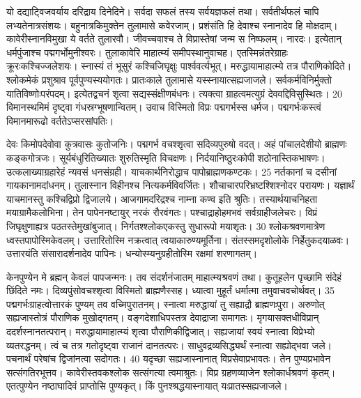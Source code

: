 यो दद्याट्विजवर्याय दरिद्राय दिनेदिने।
 सर्वदा सफलं तस्य सर्वयज्ञफलं तथा।
 सर्वतीर्थफलं चापि लभ्यतेनात्रसंशयः।
 बहुनात्रकिमुक्तेन तुलामासे कवेरजाम्।
 प्रशंसंति हि देवाश्च स्नानादेव हि मोक्षदाम्।
 कावेरीस्नानविमुखा ये वर्तते तुलारवौ।
 जीवच्चवाश्च ते विप्रास्तेषां जन्म स निष्फलम्।
 नारदः।
 इत्येतान् धर्मपुंजाश्च पद्मगर्भोमुनीश्वरः।
 तुलाकावेरि माहात्म्यं समीपस्थानुवाचह।
 एतस्मिन्नंतरेग्राहः क्रूरःकश्चिज्जलेशयः।
 स्नास्यं तं भूसुरं कश्चिजिघृक्षुः पार्श्ववर्त्यभूत्।
 मरुद्धायामाहात्म्ये तत्र पौराणिकोदिते।
 श्लोकमेकं प्रशुश्राव पूर्वपुण्यस्ययोगतः।
 प्रातःकाले तुलामासे यस्स्नायात्सह्यजाजले।
 सर्वकर्मविनिर्मुक्तो यातिविष्णोःपरंपदम्।
 इत्येतद्वचनं शृत्वा सद्यस्संक्षीणबंधनः।
 त्यक्त्वा ग्राहत्वमत्युग्रं देववद्दिविसुस्थितः।
 20 विमानस्थमिमं दृष्ट्वा गंधस्रग्भूषणान्वितम्।
 उवाच विस्मितो विप्रः पद्मगर्भस्स धर्मज।
 पद्मगर्भःकस्त्वं विमानमारूढो वर्ततेऽप्सरसांपतिः।
 
देवः किमोपदेवोवा कुत्रवासः कुतोजनिः।
 पद्मगर्भ वचश्शृत्वा सदिव्यपुरुषो वदत्।
 अहं पांचालदेशीयो ब्राह्मणः कङ्कगोत्रजः।
 सूर्यबंधुरितिख्यातः शुरुतिस्मृति विचक्षणः।
 निर्दयानिष्ठुरःकोपी शठोनास्तिकभाषणः।
 उत्कलाख्याग्रहारेहं न्यवसं धनसंग्रही।
 याचकार्थनिरोद्धाच पापोब्राह्मणकण्टकः।
 25 नर्तकानां च दसीनां गायकानामदांधनम्।
 तुलास्नान विहीनश्च नित्यकर्मविवर्जितः।
 शौचाचारपरिभ्रष्टश्शिश्नोदर परायणः।
 यज्ञार्थं याचमानस्तु कश्चिद्विप्रो द्विजालये।
 आजगामदरिद्रश्च नाम्ना कण्व इति श्रुतिः।
 तस्यार्थयाचनिहता मयाग्रामैकलोभिना।
 तेन पापेननष्टायुर् नरकं रौरवंगतः।
 पश्चाद्राहोहमभवं सर्वग्राहीजलेचरः।
 विप्रं जिघृक्षुणाह्यत्र पठतस्तेमुखांबुजात्।
 निर्गतश्श्लोकएकस्तु सुधारूपो मयाशृतः।
 30 श्लोकश्रवणमात्रेण ध्वस्तपापोस्मिकेवलम्।
 उत्तारितोस्मि नक्रत्वात् त्वयाकारुण्यमूर्तिना।
 संतस्समदृशोलोके निर्हेतुकदयाळवः।
 उत्तारयंति संसारादर्शनादेव पापिनः।
 धन्योस्म्यनुग्रहीतोस्मि रक्षमां शरणागतम्।
 
केनपुण्येन मे ब्रह्मन् केवलं पापजन्मनः।
 तव संदर्शनंजातम् माहात्म्यश्रवणं तथा।
 कुतूहलेन पृच्छामि संदेहं छिंदिते नमः।
 दिव्यपुंसोवचश्शृत्वा विस्मितो ब्राह्मणैस्सह।
 ध्यात्वा मुहूर्तं धर्मात्मा तमुवाचवचोर्थवत्।
 35 पद्मगर्भःग्राहत्वोत्तारकं पुण्यम् तव वच्मिपुरातनम्।
 स्नात्वा मरुद्धायां तु सह्याद्रौ ब्राह्मणःपुरा।
 अरुणोत् सह्यजास्तोत्रं पौराणिक मुखोद्गतम्।
 वङ्गदेशाधिपस्तत्र देवाद्राजा समागतः।
 मृगयासक्तधीविप्रान् ददर्शस्नानतत्परान्।
 मरुद्धायामाहात्म्यं शृत्वा पौराणिकीद्विजात्।
 सह्यजायां स्वयं स्नात्वा विप्रेभ्यो व्यतरद्धनम्।
 त्वं च तत्र गतोदृष्ट्वा राजानं दानतत्परः।
 साधुवद्रव्यसिद्ध्यर्थं स्नात्वा सह्योद्भवा जले।
 पचनार्थं परेषांच द्विजांनत्वा सदोगतः।
 40 यदृच्छा सह्यजास्नानात् विप्रसेवाप्रभावतः।
 तेन पुण्यप्रभावेन सत्संगतिरभूत्तव।
 कावेरीस्तवकश्लोक सत्संगत्या त्वमाश्रुतः।
 विप्र ग्रहणव्याजेन श्लोकार्धश्रवणं कृतम्।
 एतत्पुण्येन नष्ठाघादिवं प्राप्तोसि पुण्यकृत्।
 किं पुनश्श्रद्धयास्नायात् यःप्रातस्सह्यजाजले।
 
